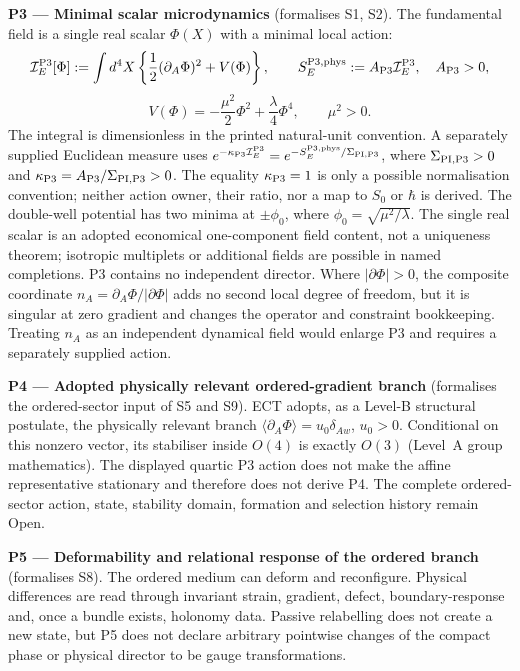 \documentclass[11pt,a4paper]{article}
\begin{document}
\textbf{P3 --- Minimal scalar microdynamics} (formalises S1, S2).
The fundamental field is a single real scalar $\Phi(X)$ with a minimal local action:
\begin{equation}
  \mathcal I_E^{\rm P3}[\Phi]
  :=\int d^4X\left\{
  \frac{1}{2}(\partial_A\Phi)^2+V(\Phi)\right\},\qquad
  S_E^{{\rm P3},{\rm phys}}
  :=A_{\rm P3}\mathcal I_E^{\rm P3},\quad A_{\rm P3}>0,
  \label{eq:pop_action}
\end{equation}
\[
 V(\Phi)=-\frac{\mu^2}{2}\Phi^2+\frac{\lambda}{4}\Phi^4,
 \qquad \mu^2>0 .
\]
The integral is dimensionless in the printed natural-unit convention.
A separately supplied Euclidean measure uses
$e^{-\kappa_{\rm P3}\mathcal I_E^{\rm P3}}
=e^{-S_E^{{\rm P3},{\rm phys}}/\Sigma_{\rm PI,P3}}$, where
$\Sigma_{\rm PI,P3}>0$ and
$\kappa_{\rm P3}=A_{\rm P3}/\Sigma_{\rm PI,P3}>0$.  The equality
$\kappa_{\rm P3}=1$ is only a possible normalisation convention; neither
action owner, their ratio, nor a map to $S_0$ or $\hbar$ is derived.
The double-well potential has two minima at $\pm\phi_0$, where
$\phi_0=\sqrt{\mu^2/\lambda}$.  The single real scalar is an adopted
economical one-component field content, not a uniqueness theorem; isotropic
multiplets or additional fields are possible in named completions.  P3
contains no independent director.  Where $|\partial\Phi|>0$, the composite
coordinate $n_A=\partial_A\Phi/|\partial\Phi|$ adds no second local degree of
freedom, but it is singular at zero gradient and changes the operator and
constraint bookkeeping.  Treating $n_A$ as an independent dynamical field
would enlarge P3 and requires a separately supplied action.

\textbf{P4 --- Adopted physically relevant ordered-gradient branch}
(formalises the ordered-sector input of S5 and S9).
ECT adopts, as a Level-B structural postulate, the physically relevant branch
$\langle\partial_A\Phi\rangle=u_0\delta_{Aw}$, $u_0>0$.  Conditional on this
nonzero vector, its stabiliser inside $O(4)$ is exactly $O(3)$ (Level~A
group mathematics).  The displayed quartic P3 action does not make the affine
representative stationary and therefore does not derive P4.  The complete
ordered-sector action, state, stability domain, formation and selection
history remain Open.

\textbf{P5 --- Deformability and relational response of the ordered branch} (formalises S8).
The ordered medium can deform and reconfigure.  Physical differences are read through invariant strain, gradient, defect, boundary-response and, once a bundle exists, holonomy data.  Passive relabelling does not create a new state, but P5 does not declare arbitrary pointwise changes of the compact phase or physical director to be gauge transformations.
\end{document}
